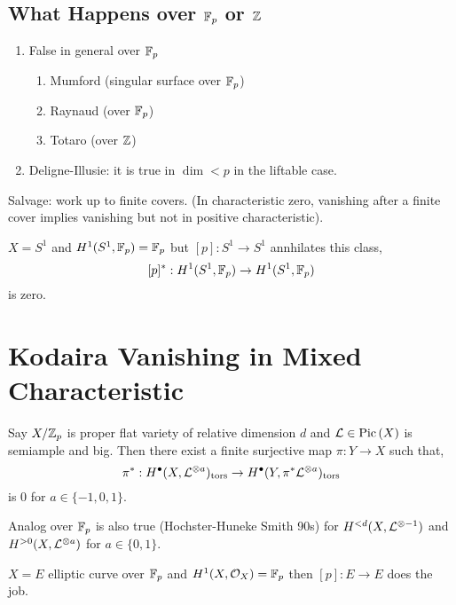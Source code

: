 \documentclass[12pt]{article}
\newcommand{\tors}{\mathrm{tors}}
\begin{document}
\subsection{What Happens over $\mathbb{F}_p$ or $\mathbb{Z}$}

\begin{enumerate}
\item False in general over $\mathbb{F}_p$
\begin{enumerate}
\item Mumford (singular surface over $\mathbb{F}_p$)
\item Raynaud (over $\mathbb{F}_p$)
\item Totaro (over $\mathbb{Z}$)
\end{enumerate}
\item Deligne-Illusie: it is true in $\dim < p$ in the liftable case. 
\end{enumerate}

Salvage: work up to finite covers. (In characteristic zero, vanishing after a finite cover implies vanishing but not in positive characteristic). 

\begin{example}
$X = S^1$ and $H^1(S^1, \mathbb{F}_p) = \mathbb{F}_p$ but $[p] : S^1 \to S^1$ annhilates this class, 
\[ [p]^* : H^1(S^1, \mathbb{F}_p) \to H^1(S^1, \mathbb{F}_p) \]
is zero. 
\end{example}
 
\section{Kodaira Vanishing in Mixed Characteristic}

\begin{theorem}
Say $X / \mathbb{Z}_p$ is proper flat variety  of relative dimension $d$ and $\mathcal{L} \in \mathrm{Pic} \left( X \right)$ is semiample and big. Then there exist a finite surjective map $\pi : Y \to X$ such that,
\[ \pi^* : H^{\bullet}(X, \L^{\ot a})_{\tors} \to H^\bullet(Y, \pi^* \L^{\ot a})_{\tors} \]
is $0$ for $a \in \{-1, 0, 1\}$.
\end{theorem}

\begin{rmk}
Analog over $\mathbb{F}_p$ is also true (Hochster-Huneke Smith 90s) for $H^{<d}(X, \mathcal{L}^{\otimes -1})$ and $H^{>0}(X, \mathcal{L}^{\otimes a})$ for $a \in \{0,1\}$.
\end{rmk}

\begin{example}
$X = E$ elliptic curve over $\mathbb{F}_p$ and $H^1(X, \mathcal{O}_{X}) = \mathbb{F}_p$ then $[p] : E \to E$ does the job. 
\end{example}
\end{document}
